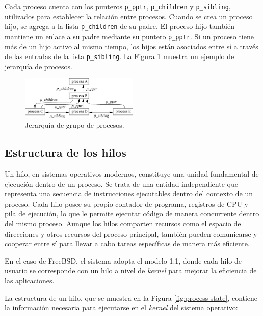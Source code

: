 Cada proceso cuenta con los punteros \texttt{p\_pptr}, \texttt{p\_children} y \texttt{p\_sibling}, utilizados para establecer la relación entre procesos. Cuando se crea un proceso hijo, se agrega a la lista \texttt{p\_children} de su padre. El proceso hijo también mantiene un enlace a su padre mediante su puntero \texttt{p\_pptr}. Si un proceso tiene más de un hijo activo al mismo tiempo, los hijos están asociados entre sí a través de las entradas de la lista \texttt{p\_sibling}. La Figura \ref{fig:process-hierarchy} muestra un ejemplo de jerarquía de procesos.

\begin{figure}[H]
    \centering
    \includegraphics[width=0.5\textwidth]{./images/process-hierarchy.jpeg}
    \caption{Jerarquía de grupo de procesos.}
    \label{fig:process-hierarchy}
\end{figure}


\subsection{Estructura de los hilos}
Un hilo, en sistemas operativos modernos, constituye una unidad fundamental de ejecución dentro de un proceso. Se trata de una entidad independiente que representa una secuencia de instrucciones ejecutables dentro del contexto de un proceso. Cada hilo posee su propio contador de programa, registros de CPU y pila de ejecución, lo que le permite ejecutar código de manera concurrente dentro del mismo proceso. Aunque los hilos comparten recursos como el espacio de direcciones y otros recursos del proceso principal, también pueden comunicarse y cooperar entre sí para llevar a cabo tareas específicas de manera más eficiente.\par

En el caso de FreeBSD, el sistema adopta el modelo 1:1, donde cada hilo de usuario se corresponde con un hilo a nivel de \textit{kernel} para mejorar la eficiencia de las aplicaciones.\par

La estructura de un hilo, que se muestra en la Figura \ref{fig:process-state}, contiene la información necesaria para ejecutarse en el \textit{kernel} del sistema operativo:

